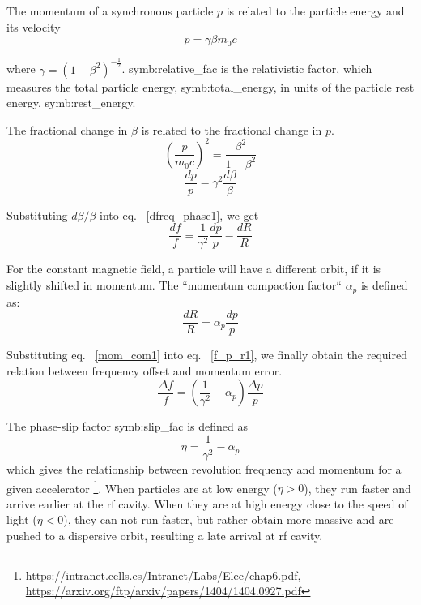The momentum of a synchronous particle $p$ is related to the particle energy and its velocity  
\begin{equation}
p=\gamma \beta m_0c
\end{equation}

where $\gamma=(1-\beta^{\mathit{2}})^{-\frac{1}{2}}$. \gls{symb:relative_fac} is the relativistic factor, which measures the total particle energy, \gls{symb:total_energy}, in units of the particle rest energy, \gls{symb:rest_energy}. 


The fractional change in $\beta$ is related to the fractional change in $p$.
\begin{equation}
(\frac{p}{m_0c})^2=\frac{\beta^2}{1-\beta^2}
\end{equation}
\begin{equation}
\label{eq:pv}
\frac{dp}{p}=\gamma^2\frac{d\beta}{\beta}
\end{equation}

Substituting $d\beta/\beta$ into eq. ~\ref{dfreq_phase1}, we get 
\begin{equation}
\frac{df}{f}=\frac{1}{\gamma^2}\frac{dp}{p}-\frac{dR}{R}\label{f_p_r1}
\end{equation} 

For the constant magnetic field, a particle will have a different orbit, if it is slightly shifted in momentum. The ``momentum compaction factor`` $\alpha_p$ is defined as:
\begin{equation}
\frac{dR}{R}=\alpha_p\frac{dp}{p}\label{mom_com1}
\end{equation} 

Substituting eq. ~\ref{mom_com1} into eq. ~\ref{f_p_r1}, we finally obtain the required relation between frequency offset and momentum error.
\begin{equation}
\frac{\Delta{f}}{f} = (\frac{1}{\gamma^2}-\alpha_{\mathit{p}})\frac{\Delta{p}}{p}
\label{eq:phaseP1}
\end{equation}

The phase-slip factor \gls{symb:slip_fac} is defined as
\begin{equation}
\label{eq:phse_slip}
\eta =\frac{1}{\gamma^2}-\alpha_{\mathit{p}}
\end{equation}
which gives the relationship between revolution frequency and momentum for a given accelerator \footnote{\url{https://intranet.cells.es/Intranet/Labs/Elec/chap6.pdf, https://arxiv.org/ftp/arxiv/papers/1404/1404.0927.pdf}}. When particles are at low energy ($\eta > 0$), they run faster and arrive earlier at the rf cavity. When they are at high energy close to the speed of light ($\eta < 0$), they can not run faster, but rather obtain more massive and are pushed to a dispersive orbit, resulting a late arrival at rf cavity. 

